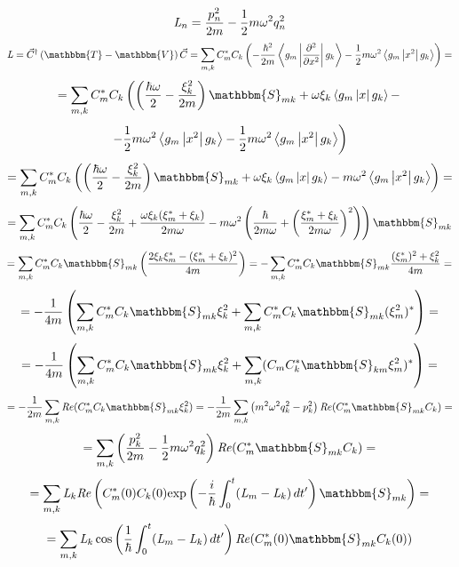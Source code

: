 $$\mathit{L}_n=\frac{p_n^2}{2m} - \frac{1}{2}m\omega^2q_n^2$$
$$\myl = \vec{C}^{\dagger}\left(\mathbbm{T}-\mathbbm{V}\right)\vec{C}=%
	 \sum_{m,k}C_m^*C_k\left(-\frac{\hbar^2}{2m}\mymean{g_m}{\frac{\partial^2}{\partial x^2}}{g_k}-%
				  \frac{1}{2}m\omega^2\mymean{g_m}{x^2}{g_k}\right)=$$
$$=\sum_{m,k}C_m^*C_k\left(\left(\frac{\hbar\omega}{2}-\frac{\xi_k^2}{2m}\right)\mathbbm{S}_{mk}+\omega\xi_k\mymean{g_m}{x}{g_k}-\right.$$
$$		\left.-\frac{1}{2}m\omega^2\left\langle g_m \left| x^2 \right| g_k \right\rangle-\frac{1}{2}m\omega^2\left\langle g_m \left| x^2 \right| g_k \right\rangle\right)$$
$$=\sum_{m,k}C_m^*C_k\left(\left(\frac{\hbar\omega}{2}-\frac{\xi_k^2}{2m}\right)\mathbbm{S}_{mk}+\omega\xi_k\mymean{g_m}{x}{g_k}-%
			   m\omega^2\mymean{g_m}{x^2}{g_k}\right)=$$
$$=\sum_{m,k}C_m^*C_k\left(\frac{\hbar\omega}{2}-\frac{\xi_k^2}{2m}+\frac{\omega\xi_k(\xi_m^*+\xi_k)}{2m\omega}-%
		   m\omega^2\left(\frac{\hbar}{2m\omega}+\left(\frac{\xi_m^*+\xi_k}{2m\omega}\right)^2\right)\right)\mathbbm{S}_{mk}$$
$$=\sum_{m,k}C_m^*C_k\mathbbm{S}_{mk}\left(\frac{2\xi_k\xi_m^*-(\xi_m^*+\xi_k)^2}{4m}\right)=%
  -\sum_{m,k}C_m^*C_k\mathbbm{S}_{mk}\frac{(\xi_m^*)^2+\xi_k^2}{4m}=$$
$$=-\frac{1}{4m}\left(\sum_{m,k}C_m^*C_k\mathbbm{S}_{mk}\xi_k^2+\sum_{m,k}C_m^*C_k\mathbbm{S}_{mk}(\xi_m^2)^*\right)=$$
$$=-\frac{1}{4m}\left(\sum_{m,k}C_m^*C_k\mathbbm{S}_{mk}\xi_k^2+\sum_{m,k}(C_mC_k^*\mathbbm{S}_{km}\xi_m^2)^*\right)=$$
$$=-\frac{1}{2m}\sum_{m,k}\mathit{Re}(C_m^*C_k\mathbbm{S}_{mk}\xi_k^2)=%
   -\frac{1}{2m}\sum_{m,k}\left(m^2\omega^2q_k^2-p_k^2\right)\mathit{Re}(C_m^*\mathbbm{S}_{mk}C_k)=$$
$$=\sum_{m,k}\left(\frac{p_k^2}{2m}-\frac{1}{2}m\omega^2q_k^2\right)\mathit{Re}(C_m^*\mathbbm{S}_{mk}C_k)=$$
$$=\sum_{m,k}\myl_k\mathit{Re}\left(C_m^*(0)C_k(0)\myexp{-\frac{i}{\hbar}\int_0^t(\myl_m-\myl_k)\,dt'}\mathbbm{S}_{mk}\right) = $$
$$= \sum_{m,k}\myl_k\cos\left(\frac{1}{\hbar}\int_0^t(\myl_m-\myl_k)\,dt'\right)\mathit{Re}(C_m^*(0)\mathbbm{S}_{mk}C_k(0))$$
